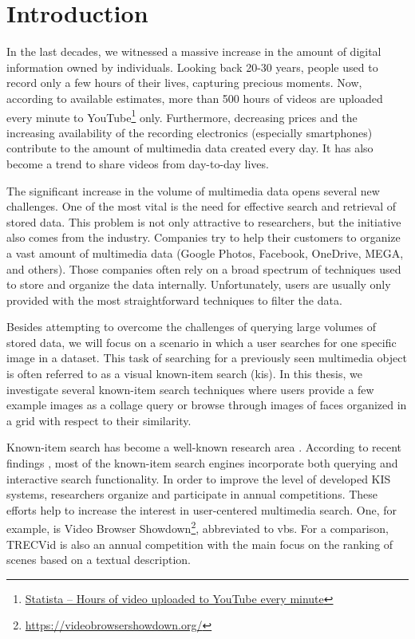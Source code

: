 \chapter*{Introduction}

In the last decades, we witnessed a massive increase in the amount of digital information owned by individuals. Looking back 20-30 years, people used to record only a few hours of their lives, capturing precious moments. Now, according to available estimates, more than 500 hours of videos are uploaded every minute to YouTube\footnote{\href{https://www.statista.com/statistics/259477/hours-of-video-uploaded-to-youtube-every-minute/}{Statista -- Hours of video uploaded to YouTube every minute}} only. Furthermore, decreasing prices and the increasing availability of the recording electronics (especially smartphones) contribute to the amount of multimedia data created every day. It has also become a trend to share videos from day-to-day lives.

The significant increase in the volume of multimedia data opens several new challenges. One of the most vital is the need for effective search and retrieval of stored data. This problem is not only attractive to researchers, but the initiative also comes from the industry. Companies try to help their customers to organize a vast amount of multimedia data (Google Photos, Facebook, OneDrive, MEGA, and others). Those companies often rely on a broad spectrum of techniques used to store and organize the data internally. Unfortunately, users are usually only provided with the most straightforward techniques to filter the data.

Besides attempting to overcome the challenges of querying large volumes of stored data, we will focus on a scenario in which a user searches for one specific image in a dataset. This task of searching for a previously seen multimedia object is often referred to as a visual known-item search (\acrshort{kis}). In this thesis, we investigate several known-item search techniques where users provide a few example images as a collage query or browse through images of faces organized in a grid with respect to their similarity.

Known-item search has become a well-known research area \citep{8352047}. According to recent findings \citep{9037125}, most of the known-item search engines incorporate both querying and interactive search functionality. In order to improve the level of developed KIS systems, researchers organize and participate in annual competitions. These efforts help to increase the interest in user-centered multimedia search. One, for example, is Video Browser Showdown\footnote{\url{https://videobrowsershowdown.org/}}, abbreviated to \acrshort{vbs}. For a comparison, TRECVid \citep{2019trecvidawad} is also an annual competition with the main focus on the ranking of scenes based on a textual description.

